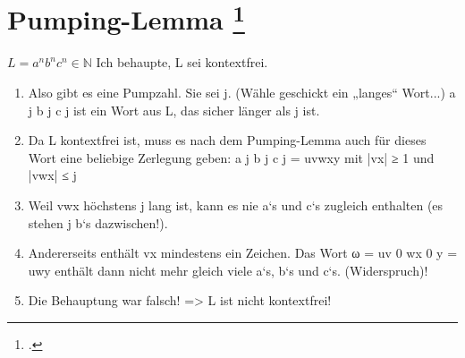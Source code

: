 \documentclass{lehramt-informatik-aufgabe}
\begin{document}
\section{Pumping-Lemma
\footcite[Seite 42]{theo:fs:2}}

$L = a^n b^n c^n \in \mathbb{N}$
Ich behaupte, L sei kontextfrei.

\begin{enumerate}
\item Also gibt es eine Pumpzahl. Sie sei j.
(Wähle geschickt ein „langes“ Wort...)
a j b j c j ist ein Wort aus L, das sicher länger als j ist.

\item  Da L kontextfrei ist, muss es nach dem Pumping-Lemma auch für dieses Wort
eine beliebige Zerlegung geben:
a j b j c j = uvwxy mit |vx| ≥ 1 und |vwx| ≤ j

\item  Weil vwx höchstens j lang ist, kann es nie a‘s und c‘s zugleich enthalten (es
stehen j b‘s dazwischen!).

\item Andererseits enthält vx mindestens ein Zeichen.
Das Wort ω = uv 0 wx 0 y = uwy enthält dann nicht mehr gleich viele a‘s, b‘s
und c‘s. (Widerspruch)!

\item Die Behauptung war falsch! => L ist nicht kontextfrei!

\end{enumerate}
\end{document}
